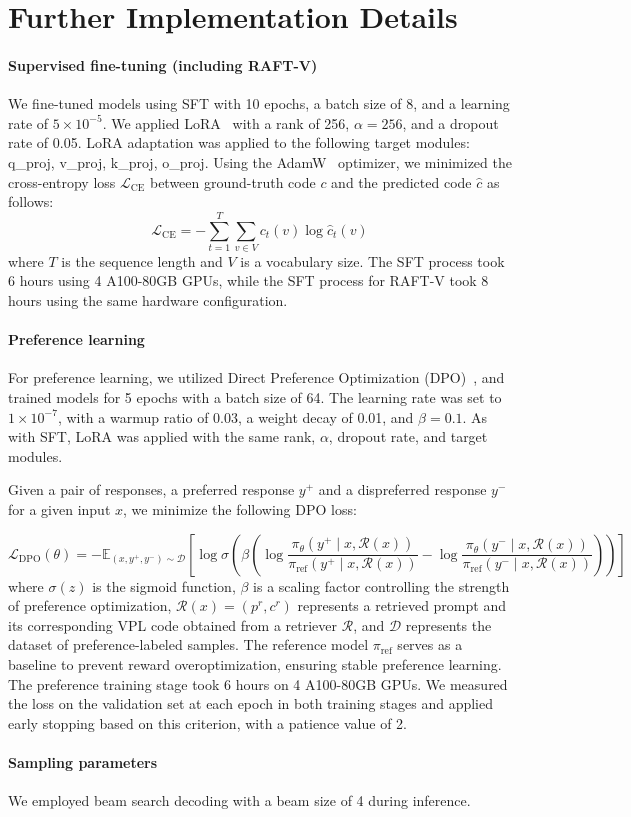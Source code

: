 \section{Further Implementation Details}\label{sec:implementation_details}
\paragraph{Supervised fine-tuning (including RAFT-V)}
We fine-tuned models using SFT with 10 epochs, a batch size of 8, and a learning rate of $5 \times 10^{-5}$. We applied LoRA~\cite{hulora} with a rank of 256, $\alpha = 256$, and a dropout rate of 0.05. LoRA adaptation was applied to the following target modules: q\_proj, v\_proj, k\_proj, o\_proj. Using the AdamW~\cite{loshchilov2018decoupled} optimizer, we minimized the cross-entropy loss $\mathcal{L}_{\text{CE}}$ between ground-truth code $c$ and the predicted code $\hat{c}$ as follows:
\begin{equation}
\nonumber
    \mathcal{L}_{\text{CE}} = - \sum_{t=1}^{T} \sum_{v \in V} c_t(v) \log \hat{c}_t(v)
\end{equation}
where $T$ is the sequence length and $V$ is a vocabulary size. The SFT process took 6 hours using 4 A100-80GB GPUs, while the SFT process for RAFT-V took 8 hours using the same hardware configuration.

\paragraph{Preference learning} For preference learning, we utilized Direct Preference Optimization (DPO)~\cite{rafailov2023direct}, and trained models for 5 epochs with a batch size of 64. The learning rate was set to $1 \times 10^{-7}$, with a warmup ratio of 0.03, a weight decay of 0.01, and $\beta=0.1$. As with SFT, {LoRA} was applied with the same rank, $\alpha$, dropout rate, and target modules.

Given a pair of responses, a preferred response $y^+$ and a dispreferred response $y^-$ for a given input $x$, we minimize the following DPO loss:

\begin{equation}
\nonumber
    \mathcal{L}_{\text{DPO}}(\theta) = -\mathbb{E}_{(x,y^+, y^-) \sim \mathcal{D}} \left[ 
    \log \sigma \left( \beta \left( \log \frac{\pi_\theta(y^+ \mid x,\mathcal{R}(x))}{\pi_{\text{ref}}(y^+ \mid x,\mathcal{R}(x))} - \log \frac{\pi_\theta(y^- \mid x,\mathcal{R}(x))}{\pi_{\text{ref}}(y^- \mid x,\mathcal{R}(x))} \right) \right) 
    \right]
\end{equation}
where $\sigma(z)$ is the sigmoid function, $\beta$ is a scaling factor controlling the strength of preference optimization, $\mathcal{R}(x)=(p^r, c^r)$ represents a retrieved prompt and its corresponding VPL code obtained from a retriever $\mathcal{R}$, and $\mathcal{D}$ represents the dataset of preference-labeled samples. The reference model $\pi_{\text{ref}}$ serves as a baseline to prevent reward overoptimization, ensuring stable preference learning. The preference training stage took 6 hours on 4 A100-80GB GPUs.
We measured the loss on the validation set at each epoch in both training stages and applied early stopping based on this criterion, with a patience value of 2. 
\paragraph{Sampling parameters} We employed beam search decoding with a beam size of 4 during inference. 
